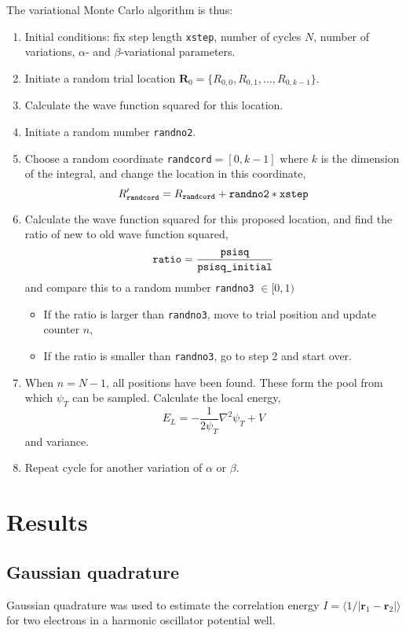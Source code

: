 \documentclass[a4paper,11pt]{article}
\begin{document}
    The variational Monte Carlo algorithm is thus:
    \begin{enumerate}
        \item Initial conditions: fix step length \texttt{xstep}, number of cycles $N$, number of variations, $\alpha$- and $\beta$-variational parameters.
    \item Initiate a random trial location $\mathbf{R}_0 = \{R_{0,0}, R_{0,1}, \dots, R_{0,k-1}\}$.
        \item Calculate the wave function squared for this location.
        \item Initiate a random number \texttt{randno2}.
        \item Choose a random coordinate \texttt{randcord}$=[0,k-1]$ where $k$ is the dimension of the integral, and change the location in this coordinate,
            \[ R_{\text{\texttt{randcord}}}' =  R_{\text{\texttt{randcord}}} + \text{\texttt{randno2}} * \text{\texttt{xstep}} \]
        \item Calculate the wave function squared for this proposed location, and find the ratio of new to old wave function squared,
            \[ \rm \text{\texttt{ratio}} = \frac{\text{\texttt{psisq}}}{\text{\texttt{psisq\_initial}}} \]
            and compare this to a random number \texttt{randno3} $\in [0,1)$
                \begin{itemize}
                    \item If the ratio is larger than \texttt{randno3}, move to trial position and update counter $n$,
                    \item If the ratio is smaller than \texttt{randno3}, go to step 2 and start over.
                \end{itemize}
        \item When $n=N-1$, all positions have been found. These form the pool from which $\psi_T$ can be sampled. Calculate the local energy, 
            \[ E_L = -\frac{1}{2\psi_T} \nabla^2 \psi_T + V \]
            and variance.
        \item Repeat cycle for another variation of $\alpha$ or $\beta$.
    \end{enumerate}


\clearpage
\section{Results}
\subsection{Gaussian quadrature}
Gaussian quadrature was used to estimate the correlation energy $I = \langle 1/|\mathbf{r}_1 - \mathbf{r}_2| \rangle$ for two electrons in a harmonic oscillator potential well.
\end{document}
